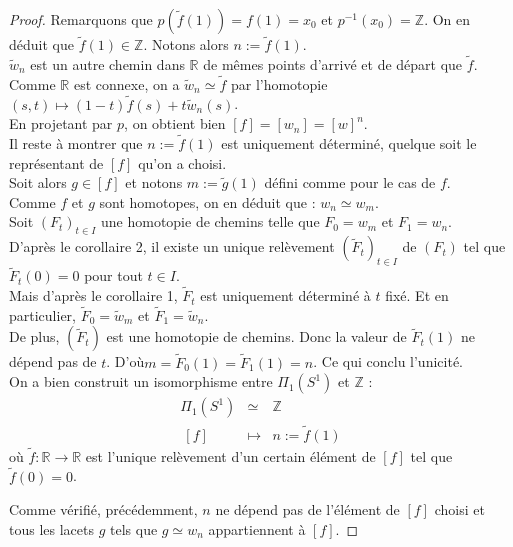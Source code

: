 \begin{proof}
			Remarquons que $p(\tilde{f}(1))=f(1)=x_{0}$ et $p^{-1}(x_{0})=\mathbb{Z}$. On en déduit que $\tilde{f}(1)\in\mathbb{Z}$. 
			Notons alors $n:=\tilde{f}(1)$.\\
			$\tilde{w}_{n}$ est un autre chemin dans $\mathbb{R}$ de mêmes points d'arrivé et de départ que $\tilde{f}$. 
			Comme $\mathbb{R}$ est connexe, on a $\tilde{w}_{n}\simeq\tilde{f}$ par l'homotopie 
			$(s,t)\mapsto(1-t)\tilde{f}(s)+t\tilde{w}_{n}(s)$.\\
			En projetant par $p$, on obtient bien $[f]=[w_{n}]=[w]^{n}$.\\
			Il reste à montrer que $n:=\tilde{f}(1)$ est uniquement déterminé, quelque soit le représentant de $[f]$ 
			qu'on a choisi.\\
			Soit alors $g\in[f]$ et notons $m:=\tilde{g}(1)$ défini comme pour le cas de $f$.\\
			Comme $f$ et $g$ sont homotopes, on en déduit que : $w_{n}\simeq w_{m}$.\\
			Soit $(F_{t})_{t\in I}$ une homotopie de chemins telle que $F_{0}=w_{m}$ et $F_{1}=w_{n}$.\\
			D'après le corollaire 2, il existe un unique relèvement $(\tilde{F}_{t})_{t\in I}$ de $(F_{t})$ tel que 
			$\tilde{F}_{t}(0)=0$ pour tout $t\in I$.\\ 
			Mais d'après le corollaire 1, $\tilde{F}_{t}$ est uniquement déterminé à $t$ fixé. Et en particulier, 
			$\tilde{F}_{0}=\tilde{w}_{m}$ et $\tilde{F}_{1}=\tilde{w}_{n}$.\\
			De plus, $(\tilde{F}_{t})$ est une homotopie de chemins. Donc la valeur de $\tilde{F}_{t}(1)$ ne dépend pas de $t$. 
			D'où\linebreak $m=\tilde{F}_{0}(1)=\tilde{F}_{1}(1)=n$. Ce qui conclu l'unicité.\\
			On a bien construit un isomorphisme entre $\Pi_{1}(S^{1})$ et $\mathbb{Z}$ :
			\[\begin{array}{ccl}
				\Pi_{1}(S^{1})	&	\simeq	&	\mathbb{Z}	\\~
				[f]				&	\mapsto	&	n:=\tilde{f}(1)
			\end{array}\]
			où $\tilde{f}:\mathbb{R}\longrightarrow\mathbb{R}$ est l'unique relèvement d'un certain élément de $[f]$ tel que 
			$\tilde{f}(0)=0$.
			
			Comme vérifié, précédemment, $n$ ne dépend pas de l'élément de $[f]$ choisi et tous les lacets $g$ tels que 
			$g\simeq w_{n}$ appartiennent à $[f]$.
		\end{proof}

